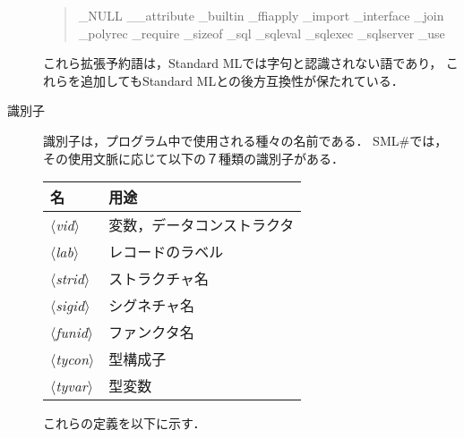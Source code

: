 \documentclass{jbook}
\newcommand{\smlsharp}{SML\#}
\newcommand{\nonterm}[1]{\mbox{$\langle$}{\it #1}\mbox{$\rangle$}}
\begin{document}
\begin{description}
\begin{tt}
\begin{quote}
\_NULL
\_\_attribute
\_builtin
\_ffiapply
\_import
\_interface
\_join
\_polyrec
\_require
\_sizeof
\_sql
\_sqleval
\_sqlexec
\_sqlserver
\_use
\end{quote}
\end{tt}

	これら拡張予約語は，Standard MLでは字句と認識されない語であり，
これらを追加してもStandard MLとの後方互換性が保たれている．


\item[識別子]
\label{sec:lexicalItems:id}
	識別子は，プログラム中で使用される種々の名前である．
	\smlsharp{}では，その使用文脈に応じて以下の７種類の識別子がある．

\begin{center}
\begin{tabular}{|l|l|}
\hline
名 & 用途\\\hline
\nonterm{vid}   & 変数，データコンストラクタ\\
\nonterm{lab}   & レコードのラベル\\
\nonterm{strid} & ストラクチャ名\\
\nonterm{sigid} & シグネチャ名\\
\nonterm{funid} & ファンクタ名\\
\nonterm{tycon} & 型構成子 \\
\nonterm{tyvar} & 型変数 \\
\hline
\end{tabular}
\end{center}

これらの定義を以下に示す．


\end{description}
\end{document}

